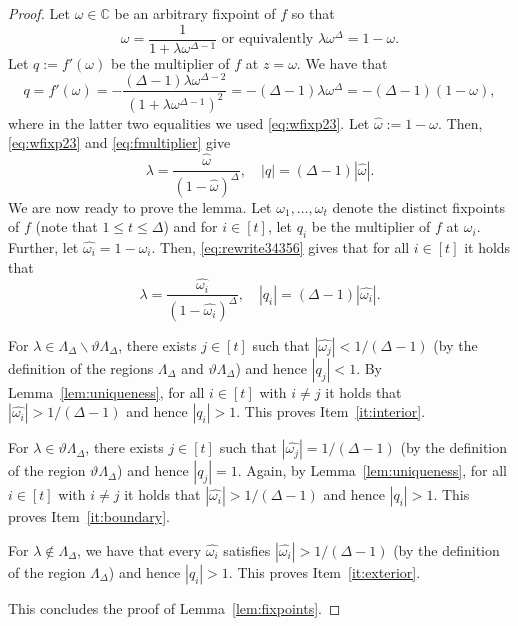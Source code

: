 \documentclass[11pt]{article}
\def\LambdaD{\Lambda_\Delta}
\def\tLambdaD{\vartheta\Lambda_\Delta}
\newcommand{\abs}[1]{\left|#1\right|}
\begin{document}
\begin{proof}
Let $\omega\in \mathbb{C}$ be an arbitrary fixpoint of $f$ so that 
\begin{equation}\label{eq:wfixp23}
\omega=\frac{1}{1+\lambda \omega^{\Delta-1}} \mbox{ or equivalently }\lambda \omega^{\Delta}=1-\omega.
\end{equation}
Let $q:=f'(\omega)$ be the multiplier of $f$ at $z=\omega$. We have that
\begin{equation}\label{eq:fmultiplier}
q=f'(\omega)=-\frac{(\Delta-1)\lambda  \omega^{\Delta-2}}{(1+\lambda \omega^{\Delta-1})^2}=-(\Delta-1)\lambda  \omega^\Delta=-(\Delta-1)(1-\omega),
\end{equation}
where in the latter two equalities we used \eqref{eq:wfixp23}. Let $\widehat{\omega}:=1-\omega$. Then, \eqref{eq:wfixp23} and \eqref{eq:fmultiplier} give
\begin{equation}\label{eq:rewrite34356}
\lambda=\frac{\widehat{\omega}}{(1-\widehat{\omega})^\Delta}, \quad |q|=(\Delta-1)\abs{\widehat{\omega}}.
\end{equation}
We are now ready to prove the lemma. Let $\omega_1,\hdots, \omega_t$ denote the distinct fixpoints of $f$ (note that $1\leq t\leq \Delta$) and for $i\in[t]$, let $q_i$ be the multiplier of $f$ at $\omega_i$. Further, let $\widehat{\omega_i}=1-\omega_i$. Then, \eqref{eq:rewrite34356} gives that for all $i\in[t]$ it holds that
\begin{equation}\label{eq:rewrite345}
\lambda=\frac{\widehat{\omega_i}}{(1-\widehat{\omega_i})^\Delta}, \quad |q_i|=(\Delta-1)\abs{\widehat{\omega_i}}.
\end{equation}



For $\lambda\in \LambdaD\backslash \tLambdaD$, there exists $j\in [t]$ such that $\abs{\widehat{\omega_{j}}}<1/(\Delta-1)$ (by the definition of the regions $\LambdaD$ and $\tLambdaD$) and hence $|q_{j}|<1$. By Lemma~\ref{lem:uniqueness}, for all $i\in [t]$ with $i\neq j$ it holds that  $\abs{\widehat{\omega_i}}>1/(\Delta-1)$ and hence $|q_{i}|>1$. This proves  Item~\ref{it:interior}.

For $\lambda\in \tLambdaD$, there exists $j\in [t]$ such that $\abs{\widehat{\omega_{j}}}=1/(\Delta-1)$ (by the definition of the region $\tLambdaD$) and hence $|q_{j}|=1$. Again, by Lemma~\ref{lem:uniqueness}, for all $i\in [t]$ with $i\neq j$ it holds that  $\abs{\widehat{\omega_i}}>1/(\Delta-1)$ and hence $|q_{i}|>1$. This proves  Item~\ref{it:boundary}.

For $\lambda\notin \LambdaD $, we have that every $\widehat{\omega_i}$ satisfies $\abs{\widehat{\omega_i}}>1/(\Delta-1)$ (by the definition of the region $\LambdaD$) and hence $|q_i|>1$. This proves Item~\ref{it:exterior}.

This concludes the proof of Lemma~\ref{lem:fixpoints}.
\end{proof}
\end{document}
